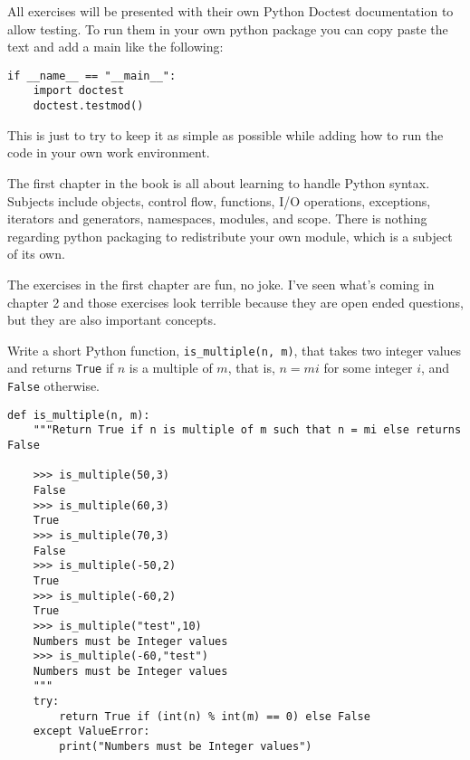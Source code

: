 
All exercises will be presented with their own Python Doctest documentation to allow testing. To run them in your own python package you can copy paste the text and add a main like the following:

\begin{lstlisting}[title=Running Doctest]
if __name__ == "__main__":
    import doctest
    doctest.testmod()
\end{lstlisting}

This is just to try to keep it as simple as possible while adding how to run the code in your own work environment.






The first chapter in the book is all about learning to handle Python syntax. Subjects include objects, control flow, functions, I/O operations, exceptions, iterators and generators, namespaces, modules, and scope. There is nothing regarding python packaging to redistribute your own module, which is a subject of its own. 

\label{ssec:Exercises}

The exercises in the first chapter are fun, no joke. I've seen what's coming in chapter 2 and those exercises look terrible because they are open ended questions, but they are also important concepts.  

 \label{sssec:ex1_1}


Write a short Python function, \texttt{is_multiple(n, m)}, that takes two integer values and returns \texttt{True} if $n$ is a multiple of $m$, that is, $n = mi$ for some integer $i$, and \texttt{False} otherwise.

\begin{lstlisting}[title=Exercise R-1.1]
def is_multiple(n, m):
    """Return True if n is multiple of m such that n = mi else returns False

    >>> is_multiple(50,3)
    False
    >>> is_multiple(60,3)
    True
    >>> is_multiple(70,3)
    False
    >>> is_multiple(-50,2)
    True
    >>> is_multiple(-60,2)
    True
    >>> is_multiple("test",10)
    Numbers must be Integer values
    >>> is_multiple(-60,"test")
    Numbers must be Integer values
    """
    try:
        return True if (int(n) % int(m) == 0) else False
    except ValueError:
        print("Numbers must be Integer values")
\end{lstlisting}

